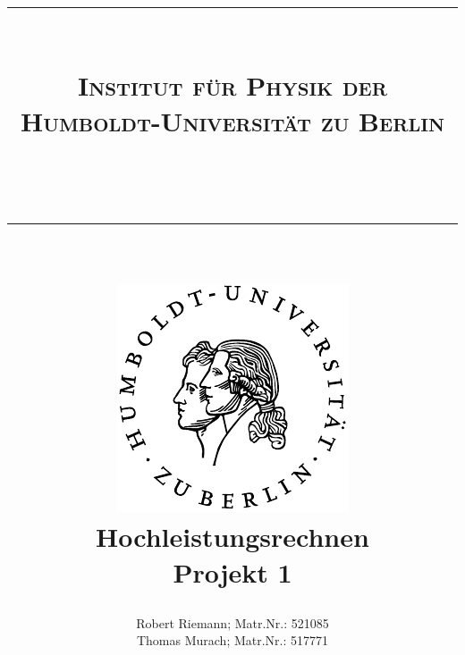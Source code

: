 \documentclass[a4paper,oneside,bibtotoc,pointlessnumbers,
halfparskip,DIV15]{scrartcl}
\newcommand{\lref}[1]{Listing (\ref{lst:#1})} %
\newcommand{\eref}[1]{Gl. (\ref{eqn:#1})} %
\begin{document}
\title{{\centering \rule{15cm}{0.001cm}\\
\Large{\textsc{Institut für Physik der
Humboldt-Universität zu Berlin}}}\\ \centering \rule{15cm}{0.001cm}\\
\vspace{15mm} \centering
\includegraphics[scale=0.9]{../../assets/siegel}\\
\vspace{18mm}
{\bf{\huge{Hochleistungsrechnen}}}\\
\vspace{12mm}
Projekt 1\\
\vspace{15mm}
}
\author{Robert Riemann; Matr.Nr.: 521085\\
Thomas Murach; Matr.Nr.: 517771\vspace{18mm}}
\maketitle

\newpage



% 
% 
% 
% 

%
%
% 
%
%
\end{document}
